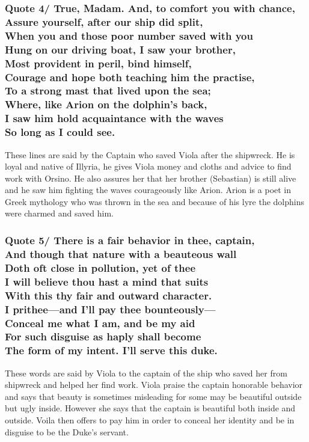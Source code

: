 \documentclass[12pt, a4paper]{article}
\begin{document}
\subsubsection*{Quote 4/
  True, Madam. And, to comfort you with chance,\\
  Assure yourself, after our ship did split,\\
	When you and those poor number saved with you	\\
	Hung on our driving boat, I saw your brother,\\
	Most provident in peril, bind himself,\\
	Courage and hope both teaching him the practise,\\
	To a strong mast that lived upon the sea;\\
	Where, like Arion on the dolphin's back,\\
	I saw him hold acquaintance with the waves\\
	So long as I could see.
}

These lines are said by the Captain who saved Viola after the shipwreck.
He is loyal and native of Illyria, he gives Viola money and cloths and
advice to find work with Orsino. He also assures her that her brother 
(Sebastian) is still alive and he saw 
him fighting the waves courageously like Arion. Arion is a poet in Greek
mythology who was thrown in the sea and because of his lyre the dolphins
were charmed and saved him.

\subsubsection*{Quote 5/
There is a fair behavior in thee, captain,\\
And though that nature with a beauteous wall\\
Doth oft close in pollution, yet of thee\\
I will believe thou hast a mind that suits\\
With this thy fair and outward character.\\
I prithee—and I’ll pay thee bounteously—\\
Conceal me what I am, and be my aid\\
For such disguise as haply shall become\\
The form of my intent. I’ll serve this duke.
}

These words are said by Viola to the captain of the ship who saved her
from shipwreck and helped her find work. Viola praise the captain 
honorable behavior and says that beauty is 
sometimes misleading for some may be beautiful outside but ugly inside.
However she says that the captain is beautiful both inside and outside.
Voila then offers to pay him in order to conceal her identity and be in
disguise to be the Duke's servant.
\end{document}
